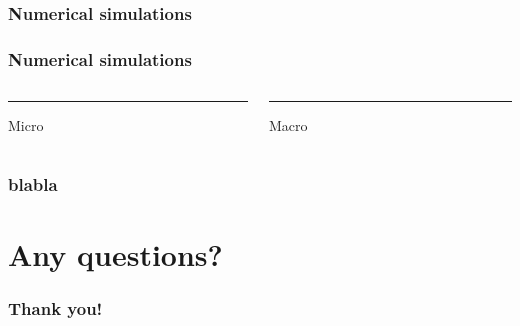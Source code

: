 \documentclass[10pt]{beamer}
\begin{document}
\begin{frame}
\frametitle{Numerical simulations}
\end{frame}


\begin{frame}
\frametitle{Numerical simulations}
\begin{columns}[T] %
	\begin{column}{.48\textwidth}
		\color{orange}\rule{\linewidth}{4pt}
		
		Micro
	\end{column}%
	\hfill%
	\begin{column}{.48\textwidth}
		\color{blue}\rule{\linewidth}{4pt}
		
		Macro
	\end{column}%
\end{columns}
\end{frame}

\begin{frame}
\frametitle{blabla}
\end{frame}




\section{Any questions?}
\begin{frame}
\frametitle{Thank you!}
\end{frame}
\end{document}
